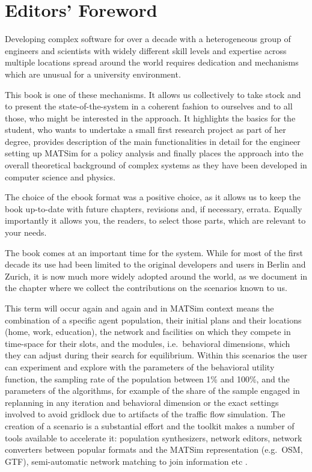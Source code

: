 \chapter*{Editors' Foreword}
Developing complex software for over a decade with a heterogeneous group of engineers and scientists with widely different skill levels and expertise across multiple locations spread around the world requires dedication and mechanisms which are unusual for a university environment. 

This book is one of these mechanisms. It allows us collectively to take stock and to present the state-of-the-system in a coherent fashion to ourselves and to all those, who might be interested in the approach. It highlights the basics for the student, who wants to undertake a small  first research project as part of her degree, provides description of the main functionalities in detail for the engineer setting up MATSim for a policy analysis and finally places the approach into the overall theoretical background of complex systems as they have been developed in computer science and physics. 

The choice of the ebook format was a positive choice, as it allows us to keep the book up-to-date with future chapters, revisions and, if necessary, errata. Equally importantly it allows you, the readers, to select those parts, which are relevant to your needs. 

The book comes at an important time for the system. While for most of the first decade its use had been limited to the original developers and users in Berlin and Zurich, it is now much more widely adopted around the world, as we document in the chapter where we collect the contributions on the scenarios known to us. 

This term will occur again and again and in MATSim context means the combination of a specific agent population, their initial plans and their locations (home, work, education), the network and facilities on which they compete in time-space for their slots, and the modules, i.e.\ behavioral dimensions, which they can adjust during their search for equilibrium. Within this scenarios the user can experiment and explore with the parameters of the behavioral utility function, the sampling rate of the population between 1\% and 100\%, and the parameters of the algorithms, for example of the share of the sample engaged in replanning in any iteration and behavioral dimension or the exact settings involved to avoid gridlock due to artifacts of the traffic flow simulation. The creation of a \gls{scenario} is a substantial effort and the toolkit makes a number of tools available to accelerate it: population synthesizers, network editors, network converters between popular formats and the MATSim representation (e.g.\ OSM, GTF), semi-automatic network matching to join information etc .

